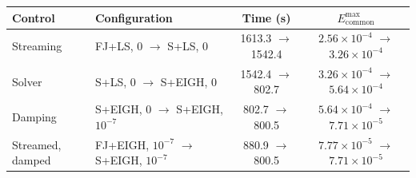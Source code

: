 \begin{tabular}{llcc}
\hline
Control & Configuration & Time (s) & $E_{\mathrm{common}}^{\max}$ \\
\hline
Streaming & FJ+LS, 0 $\to$ S+LS, 0 & 1613.3 $\to$ 1542.4 & $2.56 \times 10^{-4}$ $\to$ $3.26 \times 10^{-4}$ \\
Solver & S+LS, 0 $\to$ S+EIGH, 0 & 1542.4 $\to$ 802.7 & $3.26 \times 10^{-4}$ $\to$ $5.64 \times 10^{-4}$ \\
Damping & S+EIGH, 0 $\to$ S+EIGH, $10^{-7}$ & 802.7 $\to$ 800.5 & $5.64 \times 10^{-4}$ $\to$ $7.71 \times 10^{-5}$ \\
Streamed, damped & FJ+EIGH, $10^{-7}$ $\to$ S+EIGH, $10^{-7}$ & 880.9 $\to$ 800.5 & $7.77 \times 10^{-5}$ $\to$ $7.71 \times 10^{-5}$ \\
\hline
\end{tabular}
